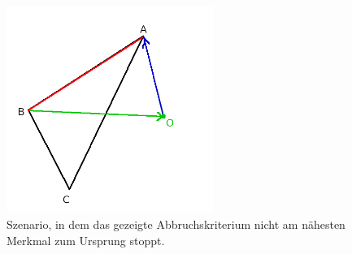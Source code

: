 \begin{figure}
	\centering
	\includegraphics[width=0.6\textwidth]{./res/why_criteria.png}
	\caption{Szenario, in dem das gezeigte Abbruchskriterium nicht am nähesten Merkmal zum Ursprung stoppt.}
	\label{fig:why_criteria}
\end{figure}

